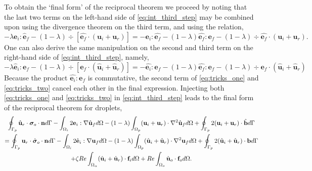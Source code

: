To obtain the `final form' of the reciprocal theorem we proceed by noting that the last two terms on the left-hand side  of \ref{eq:int_third_step} may be combined upon using the divergence theorem on the third term, and using the relation, 
\begin{equation}
    - \lambda \textbf{e}_i : \hat{\textbf{e}}_f
    - (1-\lambda)\div [\hat{\textbf{e}_f} \cdot (\textbf{u}_i + \textbf{u}_r)]
    =
    - \textbf{e}_i : \hat{\textbf{e}_f}
    - (1-\lambda) \hat{\textbf{e}_f}:\textbf{e}_f
    - (1-\lambda)\div \hat{\textbf{e}_f} \cdot (\textbf{u}_i + \textbf{u}_r).
    \label{eq:tricks_two}
\end{equation}
One can also derive the same manipulation on the second and third term on the right-hand side of \ref{eq:int_third_step}, namely,
\begin{equation}
    - \lambda \hat{\textbf{e}}_i : {\textbf{e}}_f
    - (1-\lambda)\div [{\textbf{e}_f} \cdot (\hat{\textbf{u}}_i + \hat{\textbf{u}}_r)]
    =
    - \hat{\textbf{e}_i} : {\textbf{e}_f}
    - (1-\lambda) \hat{\textbf{e}_f}:\textbf{e}_f
    - (1-\lambda)\div {\textbf{e}_f} \cdot (\hat{\textbf{u}}_i + \hat{\textbf{u}}_r)
    \label{eq:tricks_one}
\end{equation}
Because the product $\hat{\textbf{e}_i} : {\textbf{e}_f}$ is commutative, the second term of \ref{eq:tricks_one} and \ref{eq:tricks_two} cancel each other in the final expression.  
Injecting both \ref{eq:tricks_one} and \ref{eq:tricks_two} in \ref{eq:int_third_step} leads to the final form of the reciprocal theorem for droplets, 
\begin{multline}
    \intS[p]{\hat{\textbf{u}}_{r} \cdot  \bm\sigma_{o}\cdot \textbf{n}}
    - \intO[i]{2\textbf{e}_i : \grad\hat{\textbf{u}}_f}
    - (1-\lambda) \intO[p]{(\textbf{u}_{i} + \textbf{u}_r)\cdot \grad^2 \hat{\textbf{u}}_f}
    + \intS[p]{2(\textbf{u}_{i} + \textbf{u}_r)\cdot \hat{\textbf{b}}}
    \\
    =
    \intS[p]{\textbf{u}_{r}\cdot \hat{\bm\sigma}_{o}\cdot \textbf{n}}
    - \intO[i]{2\hat{\textbf{e}}_i :\grad\textbf{u}_f}
    - (1-\lambda) \intO[p]{(\hat{\textbf{u}}_{i} + \hat{\textbf{u}}_r) \cdot \grad^2 \textbf{u}_f }
    + \intS[p]{2(\hat{\textbf{u}}_{i} + \hat{\textbf{u}}_r) \cdot  \textbf{b}}
    \\ 
    + \zeta Re \intO{(\hat{\textbf{u}}_i+\hat{\textbf{u}}_r)\cdot \textbf{f}_{i}} 
    + Re\intO[o]{\hat{\textbf{u}}_{o}\cdot \textbf{f}_{o}}.
    \label{eq:int_final_step}
\end{multline}
